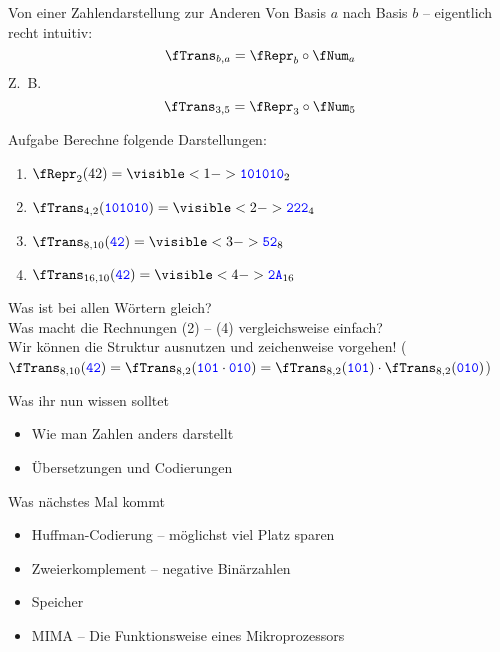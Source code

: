 %

\begin{frame}{Von einer Zahlendarstellung zur Anderen}
	\vspace{-.2\baselineskip}
	Von Basis $a$ nach Basis $b$ -- eigentlich recht intuitiv:
	$$\fTrans_{b,a} = \fRepr_b \after \fNum_a$$
	Z.~B.
	$$\fTrans_{3,5} = \fRepr_3 \after \fNum_5$$
	
	\begin{block}{Aufgabe}
		Berechne folgende Darstellungen:\\
		\begin{enumerate}[(1)]
			\item $\fRepr_2(42) = \visible<1->{ \word{101010}_2}$ 
			\item $\fTrans_{4,2}(\word{101010}) = \visible<2->{ \word{222}_4}$ 
			\item $\fTrans_{8,10}(\word{42}) = \visible<3->{ \word{52}_8}$ 
			\item $\fTrans_{16,10}(\word{42}) = \visible<4->{ \word{2A}_{16}}$
		\end{enumerate}
	\end{block}

	Was ist bei allen Wörtern gleich?  \\
	Was macht die Rechnungen (2) -- (4) vergleichsweise einfach? \pause[6] \\
	\impl Wir können die Struktur ausnutzen und zeichenweise vorgehen! ($\fTrans_{8,10}(\word{42}) = \fTrans_{8,2}(\word{101} \cdot \word{010}) = \fTrans_{8,2}(\word{101}) \cdot \fTrans_{8,2}(\word{010})$)
\end{frame}



%

\begin{frame}	
	\begin{block}{Was ihr nun wissen solltet}
		\begin{itemize}
			\item Wie man Zahlen anders darstellt
			\item Übersetzungen und Codierungen
		\end{itemize}
	\end{block}
	
	\begin{block}{Was nächstes Mal kommt}
		\begin{itemize}
			\item Huffman-Codierung -- möglichst viel Platz sparen
			\item Zweierkomplement -- negative Binärzahlen
			\item Speicher
			\item MIMA -- Die Funktionsweise eines Mikroprozessors
		\end{itemize}
	\end{block}
\end{frame}


\slideThanks

